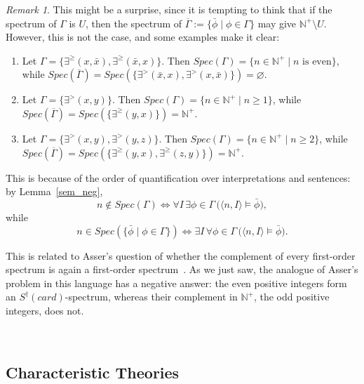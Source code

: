 \documentclass[12pt, reqno]{amsart}
\theoremstyle{definition}
\theoremstyle{remark}
\newtheorem{remark}[theorem]{Remark}
\numberwithin{equation}{section}
\begin{document}
\begin{remark}
This might be a surprise, since it is tempting to think that if the spectrum of $\Gamma$ is $U$, then the spectrum of $\overline{\Gamma} \mathrel{:=} \{\bar{\phi} \mid \phi \in \Gamma\}$ may give $\mathbb{N}^+\setminus U$. However, this is not the case, and some examples make it clear:

\begin{enumerate}
	\item Let $\Gamma = \{\exists^{\geq}(x, \bar{x}), \exists^{\geq}(\bar{x}, x)\}$. Then $Spec(\Gamma) = \{n \in \mathbb{N}^+ \mid n\text{ is even}\}$, while $Spec(\overline{\Gamma}) = Spec(\{\exists^{>}(\bar{x}, x), \exists^{>}(x, \bar{x})\}) = \varnothing$.
	\item Let $\Gamma = \{\exists^{>}(x, y)\}$. Then $Spec(\Gamma) = \{n \in \mathbb{N}^+ \mid n \geq 1\}$, while $Spec(\overline{\Gamma}) = Spec(\{\exists^{\geq}(y, x)\}) = \mathbb{N}^+$.
	\item Let $\Gamma = \{\exists^{>}(x, y), \exists^{>}(y, z)\}$. Then $Spec(\Gamma) = \{n \in \mathbb{N}^+ \mid n \geq 2\}$, while $Spec(\overline{\Gamma}) = Spec(\{\exists^{\geq}(y, x), \exists^{\geq}(z, y)\}) = \mathbb{N}^+$.
\end{enumerate}

This is because of the order of quantification over interpretations and sentences: by
Lemma~\ref{sem_neg},
\[
n \notin Spec(\Gamma) \iff \forall I\, \exists \phi \in \Gamma\,
\bigl(\langle n, I\rangle \models \bar{\phi}\bigr),
\]
while
\[
n \in Spec(\{\bar{\phi} \mid \phi \in \Gamma\}) \iff \exists I\, \forall \phi \in \Gamma\,
\bigl(\langle n, I\rangle \models \bar{\phi}\bigr).
\]

This is related to Asser's question of whether the complement of every first-order spectrum is again a first-order spectrum~\cite{Asser1955,SpectrumSurvey}. As we just saw, the analogue of Asser's problem in this language has a negative answer: the even positive integers form an $S^\dagger(card)$-spectrum, whereas their complement in $\mathbb N^+$, the odd positive integers, does not.

\end{remark}



\hfill \\ 
\subsection{Characteristic Theories} \hfill \\ 
\end{document}

